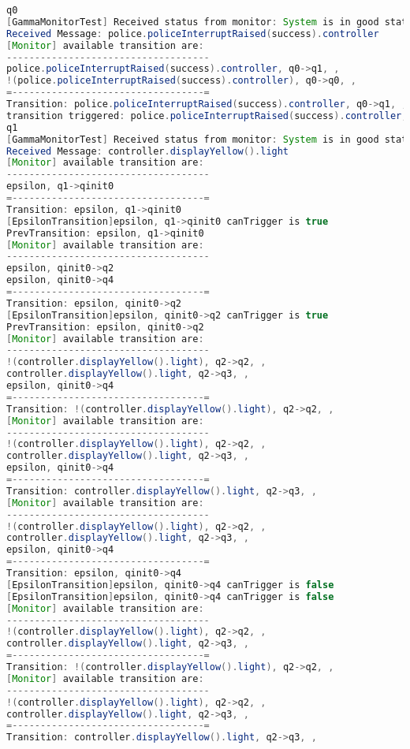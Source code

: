 \begin{lstlisting}[language=java, frame=single, float=ht!, caption={Szenárió szöveges leírása.},captionpos=b]
q0
[GammaMonitorTest] Received status from monitor: System is in good state.
Received Message: police.policeInterruptRaised(success).controller
[Monitor] available transition are:
------------------------------------
police.policeInterruptRaised(success).controller, q0->q1, ,
!(police.policeInterruptRaised(success).controller), q0->q0, ,
=----------------------------------=
Transition: police.policeInterruptRaised(success).controller, q0->q1, ,
transition triggered: police.policeInterruptRaised(success).controller, q0->q1, ,
q1
[GammaMonitorTest] Received status from monitor: System is in good state.
Received Message: controller.displayYellow().light
[Monitor] available transition are:
------------------------------------
epsilon, q1->qinit0
=----------------------------------=
Transition: epsilon, q1->qinit0
[EpsilonTransition]epsilon, q1->qinit0 canTrigger is true
PrevTransition: epsilon, q1->qinit0
[Monitor] available transition are:
------------------------------------
epsilon, qinit0->q2
epsilon, qinit0->q4
=----------------------------------=
Transition: epsilon, qinit0->q2
[EpsilonTransition]epsilon, qinit0->q2 canTrigger is true
PrevTransition: epsilon, qinit0->q2
[Monitor] available transition are:
------------------------------------
!(controller.displayYellow().light), q2->q2, ,
controller.displayYellow().light, q2->q3, ,
epsilon, qinit0->q4
=----------------------------------=
Transition: !(controller.displayYellow().light), q2->q2, ,
[Monitor] available transition are:
------------------------------------
!(controller.displayYellow().light), q2->q2, ,
controller.displayYellow().light, q2->q3, ,
epsilon, qinit0->q4
=----------------------------------=
Transition: controller.displayYellow().light, q2->q3, ,
[Monitor] available transition are:
------------------------------------
!(controller.displayYellow().light), q2->q2, ,
controller.displayYellow().light, q2->q3, ,
epsilon, qinit0->q4
=----------------------------------=
Transition: epsilon, qinit0->q4
[EpsilonTransition]epsilon, qinit0->q4 canTrigger is false
[EpsilonTransition]epsilon, qinit0->q4 canTrigger is false
[Monitor] available transition are:
------------------------------------
!(controller.displayYellow().light), q2->q2, ,
controller.displayYellow().light, q2->q3, ,
=----------------------------------=
Transition: !(controller.displayYellow().light), q2->q2, ,
[Monitor] available transition are:
------------------------------------
!(controller.displayYellow().light), q2->q2, ,
controller.displayYellow().light, q2->q3, ,
=----------------------------------=
Transition: controller.displayYellow().light, q2->q3, ,

\end{lstlisting}
